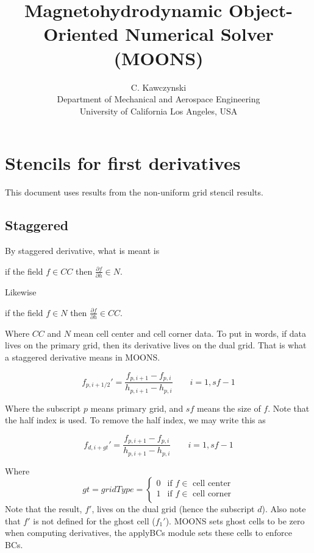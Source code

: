 \documentclass[11pt]{article}
\begin{document}
\doublespacing
\title{Magnetohydrodynamic Object-Oriented Numerical Solver (MOONS)}
\author{C. Kawczynski \\
Department of Mechanical and Aerospace Engineering \\
University of California Los Angeles, USA\\
}
\maketitle

\section{Stencils for first derivatives}
This document uses results from the non-uniform grid stencil results.

\subsection{Staggered}
By staggered derivative, what is meant is

if the field $f\in CC$ then $\frac{\partial f}{\partial h}\in N$.  

Likewise

if the field $f\in N$ then $\frac{\partial f}{\partial h}\in CC$.  

Where $CC$ and $N$ mean cell center and cell corner data. To put in words, if data lives on the primary grid, then its derivative lives on the dual grid. That is what a staggered derivative means in MOONS.

\begin{equation}
	f_{p,i+1/2}' = \frac{f_{p,i+1}-f_{p,i}}{h_{p,i+1}-h_{p,i}} \qquad i=1,sf-1
\end{equation}

Where the subscript $p$ means primary grid, and $sf$ means the size of $f$. Note that the half index is used. To remove the half index, we may write this as

\begin{equation}
	f_{d,i+gt}' = \frac{f_{p,i+1}-f_{p,i}}{h_{p,i+1}-h_{p,i}} \qquad i=1,sf-1
\end{equation}

Where
 \begin{equation}
   gt = gridType = 
  \begin{cases} 
      0 & \text{if $f \in $ cell center} \\
      1 & \text{if $f \in $ cell corner} \\
   \end{cases}
\end{equation}
Note that the result, $f'$, lives on the dual grid (hence the subscript $d$). Also note that $f'$ is not defined for the ghost cell ($f_1'$). MOONS sets ghost cells to be zero when computing derivatives, the applyBCs module sets these cells to enforce BCs.
\end{document}
